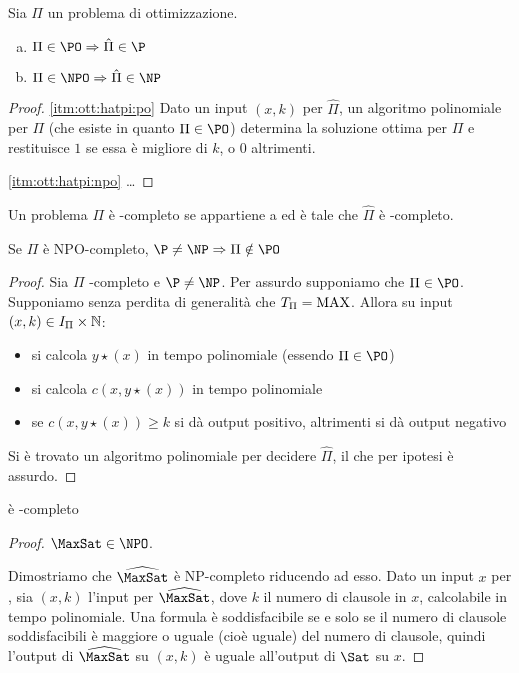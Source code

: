 \begin{theorem}
	Sia $\Pi$ un problema di ottimizzazione.
	\begin{enumerate}[(a)]
		\item \label{itm:ott:hatpi:po}$\Pi\in\PO \impl\hat\Pi\in\P$
		\item \label{itm:ott:hatpi:npo}$\Pi\in\NPO \impl\hat\Pi\in\NP$
	\end{enumerate}
\end{theorem}
\begin{proof}
	\ref{itm:ott:hatpi:po} Dato un input $(x,k)$ per $\hat\Pi$, un algoritmo polinomiale per $\Pi$ (che esiste in quanto $\Pi\in\PO$) determina la soluzione ottima per $\Pi$ e restituisce $1$ se essa è migliore di $k$, o $0$ altrimenti.

	\ref{itm:ott:hatpi:npo} \dots
\end{proof}

\begin{defin}
	Un problema $\Pi$ è \NPO-completo se appartiene a \NPO ed è tale che $\hat\Pi$ è \NP-completo.
\end{defin}

\begin{theorem}
	Se $\Pi$ è NPO-completo, $\P\neq \NP\impl\Pi\notin\PO$
\end{theorem}
\begin{proof}
	Sia $\Pi$ \NPO-completo e $\P\neq\NP$.	Per assurdo supponiamo che $\Pi\in\PO$. Supponiamo senza perdita di generalità che $T_\Pi=\mathrm{MAX}$. Allora su input $(x,k)\in I_\Pi\times\mathbb N$:
	\begin{itemize}
		\item si calcola $y\star(x)$ in tempo polinomiale (essendo $\Pi\in\PO$)
		\item si calcola $c(x,y\star(x))$ in tempo polinomiale
		\item se $c(x,y\star(x))\geq k$ si dà output positivo, altrimenti si dà output negativo
	\end{itemize}
	Si è trovato un algoritmo polinomiale per decidere $\hat\Pi$, il che per ipotesi è assurdo.
\end{proof}

\begin{theorem}
	\MaxSat è \NPO-completo
\end{theorem}
\begin{proof}
	$\MaxSat\in\NPO$.

	Dimostriamo che $\widehat{\MaxSat}$ è NP-completo riducendo \Sat ad esso. Dato un input $x$ per \Sat, sia $(x,k)$ l'input per $\widehat{\MaxSat}$, dove $k$ il numero di clausole in $x$, calcolabile in tempo polinomiale. Una formula è soddisfacibile se e solo se il numero di clausole soddisfacibili è maggiore o uguale (cioè uguale) del numero di clausole, quindi l'output di $\widehat{\MaxSat}$ su $(x,k)$ è uguale all'output di $\Sat$ su $x$.
\end{proof}


